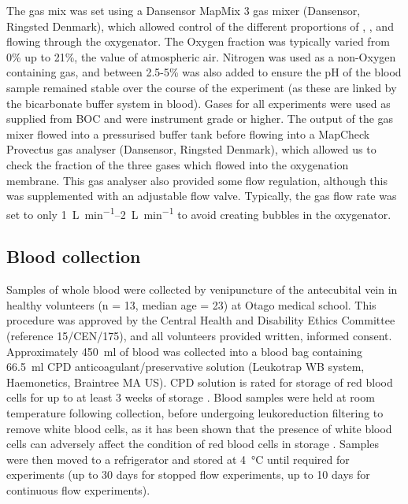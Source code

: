The gas mix was set using a Dansensor MapMix 3 gas mixer (Dansensor, Ringsted Denmark), which allowed control of the different proportions of \Ntwo, \Otwo, and \COtwo flowing through the oxygenator.
The Oxygen fraction was typically varied from 0\% up to 21\%, the value of atmospheric air.
Nitrogen was used as a non-Oxygen containing gas, and between 2.5-5\% \COtwo was also added to ensure the pH of the blood sample remained stable over the course of the experiment (as these are linked by the bicarbonate buffer system in blood).
Gases for all experiments were used as supplied from BOC and were instrument grade or higher.
The output of the gas mixer flowed into a pressurised buffer tank before flowing into a MapCheck Provectus gas analyser (Dansensor, Ringsted Denmark), which allowed us to check the fraction of the three gases which flowed into the oxygenation membrane.
This gas analyser also provided some flow regulation, although this was supplemented with an adjustable flow valve.
Typically, the gas flow rate was set to only \SIrange[per-mode=symbol]{1}{2}{\liter\per\minute} to avoid creating bubbles in the oxygenator.

\subsection{Blood collection}
Samples of whole blood were collected by venipuncture of the antecubital vein in healthy volunteers (n = 13, median age = 23) at Otago medical school.
This procedure was approved by the Central Health and Disability Ethics Committee (reference 15/CEN/175), and all volunteers provided written, informed consent.
Approximately \SI{450}{ml} of blood was collected into a blood bag containing \SI{66.5}{\milli\litre} CPD anticoagulant/preservative solution (Leukotrap WB system, Haemonetics, Braintree MA US).
CPD solution is rated for storage of red blood cells for up to at least 3 weeks of storage \cite{Hessupdatesolutionsred2006}.
Blood samples were held at room temperature following collection, before undergoing leukoreduction filtering to remove white blood cells, as it has been shown that the presence of white blood cells can adversely affect the condition of red blood cells in storage \cite{Hessupdatesolutionsred2006}.
Samples were then moved to a refrigerator and stored at \SI{4}{\degreeCelsius} until required for experiments (up to 30 days for stopped flow experiments, up to 10 days for continuous flow experiments).

